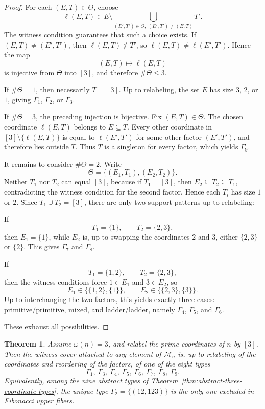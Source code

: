 \documentclass[11pt,letterpaper]{article}
\numberwithin{equation}{section}
\theoremstyle{plain}
\newtheorem{theorem}{Theorem}[section]
\theoremstyle{definition}
\theoremstyle{remark}
\begin{document}
\begin{proof}
For each $(E,T)\in\Theta$, choose
\[
\ell(E,T)\in E\setminus
\bigcup_{(E',T')\in\Theta,\ (E',T')\neq (E,T)} T'.
\]
The witness condition guarantees that such a choice exists. If
$(E,T)\neq (E',T')$, then $\ell(E,T)\notin T'$, so
$\ell(E,T)\neq \ell(E',T')$. Hence the map
\[
(E,T)\longmapsto \ell(E,T)
\]
is injective from $\Theta$ into $[3]$, and therefore $\#\Theta\le 3$.

If $\#\Theta=1$, then necessarily $T=[3]$. Up to relabeling, the set $E$ has
size $3$, $2$, or $1$, giving $\Gamma_1$, $\Gamma_2$, or $\Gamma_3$.

If $\#\Theta=3$, the preceding injection is bijective. Fix $(E,T)\in\Theta$.
The chosen coordinate $\ell(E,T)$ belongs to $E\subseteq T$. Every other
coordinate in $[3]\setminus\{\ell(E,T)\}$ is equal to $\ell(E',T')$ for some
other factor $(E',T')$, and therefore lies outside $T$. Thus $T$ is a
singleton for every factor, which yields $\Gamma_9$.

It remains to consider $\#\Theta=2$. Write
\[
\Theta=\{(E_1,T_1),(E_2,T_2)\}.
\]
Neither $T_1$ nor $T_2$ can equal $[3]$, because if $T_1=[3]$, then
$E_2\subseteq T_2\subseteq T_1$, contradicting the witness condition for the
second factor. Hence each $T_i$ has size $1$ or $2$. Since $T_1\cup T_2=[3]$,
there are only two support patterns up to relabeling:

If
\[
T_1=\{1\},
\qquad
T_2=\{2,3\},
\]
then $E_1=\{1\}$, while $E_2$ is, up to swapping the coordinates $2$ and $3$,
either $\{2,3\}$ or $\{2\}$. This gives $\Gamma_7$ and $\Gamma_8$.

If
\[
T_1=\{1,2\},
\qquad
T_2=\{2,3\},
\]
then the witness conditions force $1\in E_1$ and $3\in E_2$, so
\[
E_1\in\bigl\{\{1,2\},\{1\}\bigr\},
\qquad
E_2\in\bigl\{\{2,3\},\{3\}\bigr\}.
\]
Up to interchanging the two factors, this yields exactly three cases:
primitive/primitive, mixed, and ladder/ladder, namely
$\Gamma_4$, $\Gamma_5$, and $\Gamma_6$.

These exhaust all possibilities.
\end{proof}

\begin{theorem}
\label{thm:fibonacci-three-coordinate-types}
Assume $\omega(n)=3$, and relabel the prime coordinates of $n$ by $[3]$. Then
the witness cover attached to any element of $\mathcal M_n$ is, up to
relabeling of the coordinates and reordering of the factors, of one of the
eight types
\[
\Gamma_1,\ \Gamma_3,\ \Gamma_4,\ \Gamma_5,\ \Gamma_6,\ \Gamma_7,\ \Gamma_8,\ \Gamma_9.
\]
Equivalently, among the nine abstract types of
Theorem~\ref{thm:abstract-three-coordinate-types}, the unique type
$\Gamma_2=\{(12,123)\}$ is the only one excluded in Fibonacci upper fibers.
\end{theorem}
\end{document}
